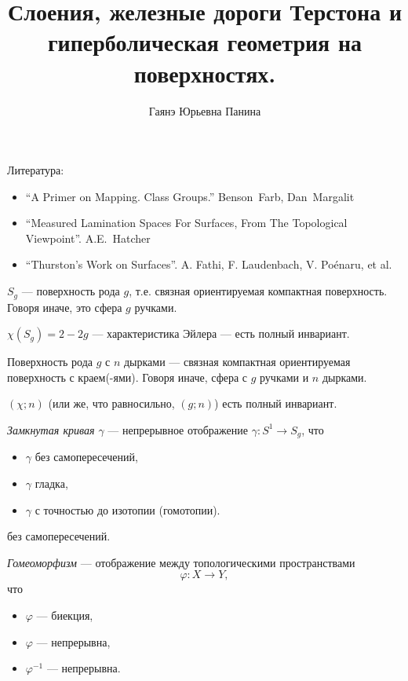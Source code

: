 \documentclass[12pt,a4paper]{article}
\title{Слоения, железные дороги Терстона и гиперболическая геометрия на поверхностях.}
\author{Гаянэ Юрьевна Панина}
\begin{document}
    \maketitle

    Литература:
    \begin{itemize}
        \item ``A Primer on Mapping. Class Groups.'' Benson~Farb, Dan~Margalit
        \item ``Measured Lamination Spaces For Surfaces, From The Topological Viewpoint''. A.E.~Hatcher
        \item ``Thurston's Work on Surfaces''. A. Fathi, F. Laudenbach, V. Po\'enaru, et al.
    \end{itemize}

    \begin{definition}
        $S_g$ --- поверхность рода $g$, т.е. связная ориентируемая компактная поверхность. Говоря иначе, это сфера $g$ ручками.
    \end{definition}

    \begin{lemma}
        $\chi(S_g) = 2 - 2g$ --- характеристика Эйлера --- есть полный инвариант.
    \end{lemma}

    \begin{definition}
        Поверхность рода $g$ с $n$ дырками --- связная компактная ориентируемая поверхность с краем(-ями). Говоря иначе, сфера с $g$ ручками и $n$ дырками.
    \end{definition}

    \begin{lemma}
        $(\chi; n)$ (или же, что равносильно, $(g; n)$) есть полный инвариант.
    \end{lemma}

    \begin{definition}
        \emph{Замкнутая кривая $\gamma$} --- непрерывное отображение $\gamma: S^1 \to S_g$, что
        \begin{itemize}
            \item $\gamma$ без самопересечений,
            \item $\gamma$ гладка,
            \item $\gamma$ с точностью до изотопии (гомотопии).
        \end{itemize} без самопересечений.
    \end{definition}

    \begin{definition}
        \emph{Гомеоморфизм} --- отображение между топологическими пространствами
        \[\varphi: X \to Y,\]
        что
        \begin{itemize}
            \item $\varphi$ --- биекция,
            \item $\varphi$ --- непрерывна,
            \item $\varphi^{-1}$ --- непрерывна.
        \end{itemize}
    \end{definition}
\end{document}
